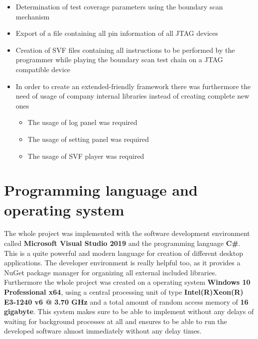 \begin{itemize}
\begin{itemize}
		\item General settings according the request of \ac{PCB}-Investigator \ac{API}
		\item Test coverage related settings for determining all components for the boundary scan test chain
		\item \ac{SVF} related settings according the programmer connection parameters to use
	\end{itemize}
	\item Determination of test coverage parameters using the boundary scan mechanism
	\item Export of a file containing all pin information of all \ac{JTAG} devices
	\item Creation of \ac{SVF} files containing all instructions to be performed by the programmer while playing the boundary scan test chain on a \ac{JTAG} compatible device
	\item In order to create an extended-friendly framework there was furthermore the need of usage of company internal libraries instead of creating complete new ones
	\begin{itemize}
		\item The usage of log panel was required
		\item The usage of setting panel was required
		\item The usage of \ac{SVF} player was required
	\end{itemize}
\end{itemize}
\label{items:req}

	\section{Programming language and operating system}
The whole project was implemented with the software development environment called \textbf{Microsoft Visual Studio 2019} and the programming language \textbf{C\#}. This is a quite powerful and modern language for creation of different desktop applications. The developer environment is really helpful too, as it provides a NuGet package manager for organizing all external included libraries. Furthermore the whole project was created on a operating system \textbf{Windows 10 Professional x64}, using a central processing unit of type \textbf{Intel(R)Xeon(R) E3-1240 v6 @ 3.70 GHz} and a total amount of random access memory of \textbf{16 gigabyte}. This system makes sure to be able to implement without any delays of waiting for background processes at all and ensures to be able to run the developed software almost immediately without any delay times.